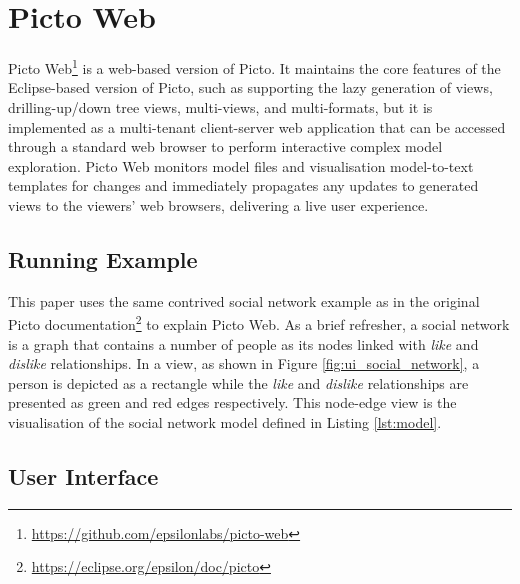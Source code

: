 \documentclass[sigconf,review]{acmart}
\begin{document}
\section{Picto Web}

Picto Web\footnote{\url{https://github.com/epsilonlabs/picto-web}} is a web-based version of Picto. 
It maintains the core features of the Eclipse-based version of Picto, such as supporting the lazy generation of views, drilling-up/down tree views, multi-views, and multi-formats, but it is implemented as a multi-tenant client-server web application that can be accessed through a standard web browser to perform interactive complex model exploration. 
Picto Web monitors model files and visualisation model-to-text templates for changes and immediately propagates any updates to generated views to the viewers' web browsers, delivering a live user experience.

\subsection{Running Example}
\label{sec:running_example}

This paper uses the same contrived social network example as in the original Picto documentation\footnote{\url{https://eclipse.org/epsilon/doc/picto}} to explain Picto Web. As a brief refresher, a social network is a graph that contains a number of people as its nodes linked with \emph{like} and \emph{dislike} relationships. In a view, as shown in Figure \ref{fig:ui_social_network}, a person is depicted as a rectangle while the \emph{like} and \emph{dislike} relationships are presented as green and red edges respectively. This node-edge view is the visualisation of the social network model defined in Listing \ref{lst:model}.

\subsection{User Interface}
\label{sec:user_interface}
\end{document}
